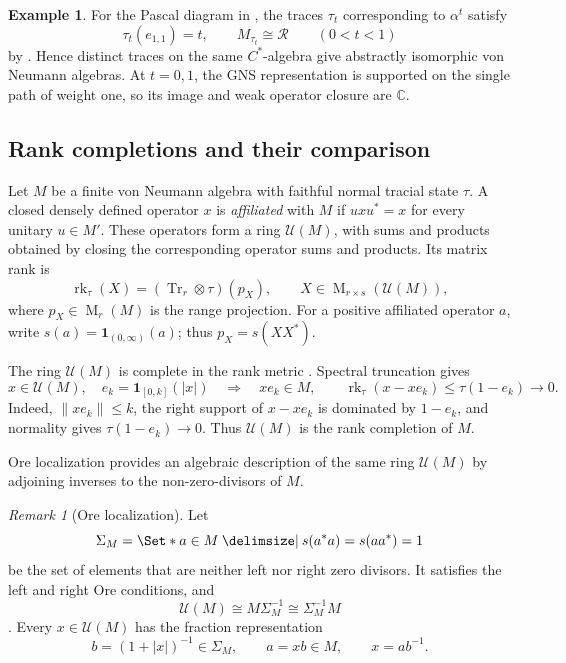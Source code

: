 \documentclass[11pt]{amsart}
\providecommand\given{}
\newcommand\SetSymbol[1][]{%
  \nonscript\:#1\vert\allowbreak\nonscript\:\mathopen{}%
}
\renewcommand\given{\SetSymbol[\delimsize]}#1%
\DeclareMathOperator{\rk}{rk}
\DeclareMathOperator{\Mat}{M}
\theoremstyle{definition}
\newtheorem{example}[theorem]{Example}
\theoremstyle{remark}
\newtheorem{remark}[theorem]{Remark}
\begin{document}
\begin{example}\label{ex:pascal-gns}
For the Pascal diagram in , the traces
$\tau_t$ corresponding to $\alpha^t$ satisfy
\[
 \tau_t(e_{1,1})=t,\qquad M_{\tau_t}\cong\mathcal R
 \qquad(0<t<1)
\]
by .  Hence distinct traces on the same
$C^*$-algebra give abstractly isomorphic von Neumann algebras.
At $t=0,1$, the GNS representation is supported on the single path
of weight one, so its image and weak operator closure are $\mathbb C$.
\end{example}

\subsection{Rank completions and their comparison}
\label{subsec:completion-mechanism}

Let $M$ be a finite von Neumann algebra with faithful normal tracial
state $\tau$.
A closed densely defined operator $x$ is \emph{affiliated} with $M$
if $uxu^*=x$ for every unitary $u\in M'$.
These operators form a ring $\mathcal U(M)$, with sums and products
obtained by closing the corresponding operator sums and products.
Its matrix rank is
\[
 \rk_\tau(X)=(\operatorname{Tr}_r\otimes\tau)(p_X),
 \qquad X\in\Mat_{r\times s}(\mathcal U(M)),
\]
where $p_X\in\Mat_r(M)$ is the range projection.  For a positive
affiliated operator $a$, write $s(a)=\mathbf 1_{(0,\infty)}(a)$; thus
$p_X=s(XX^*)$.

The ring $\mathcal U(M)$ is complete in the rank metric
\cite[Lemma~2.2]{Thom2008}.  Spectral truncation gives
\[
 x\in\mathcal U(M),\quad e_k=\mathbf 1_{[0,k]}(|x|)
 \quad\Longrightarrow\quad
 xe_k\in M,\qquad \rk_\tau(x-xe_k)\leq\tau(1-e_k)\longrightarrow0.
\]
Indeed, $\|xe_k\|\leq k$, the right support of $x-xe_k$ is dominated
by $1-e_k$, and normality gives $\tau(1-e_k)\to0$.
Thus $\mathcal U(M)$ is the rank completion of $M$.

Ore localization provides an algebraic description of the same
ring $\mathcal U(M)$ by adjoining inverses to the non-zero-divisors
of $M$.

\begin{remark}[Ore localization]\label{rem:ore-localization}
Let
\[
 \Sigma_M=\Set*{a\in M\given s(a^*a)=s(aa^*)=1}
\]
be the set of elements that are neither left nor right zero divisors.
It satisfies the left and right Ore conditions, and
\begin{equation}\label{eq:affiliated-ore-localization}
 \mathcal U(M)\cong M\Sigma_M^{-1}
 \cong\Sigma_M^{-1}M
\end{equation}
\cite[Proposition~2.2]{Vas2005}.
Every $x\in\mathcal U(M)$ has the fraction representation
\[
 b=(1+|x|)^{-1}\in\Sigma_M,\qquad
 a=xb\in M,\qquad x=ab^{-1}.
\]
\end{remark}
\end{document}
